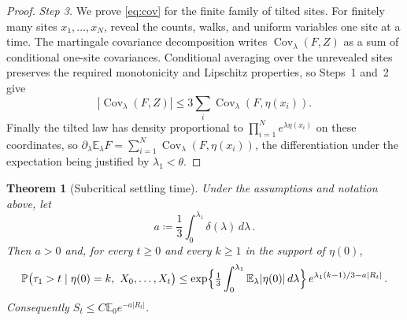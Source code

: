 \documentclass[11pt]{amsart}
\theoremstyle{plain}
\newtheorem{theorem}{Theorem}[section]
\theoremstyle{definition}
\newcommand{\E}{\mathbb{E}}
\renewcommand{\P}{\mathbb{P}}
\DeclareMathOperator{\Cov}{Cov}
\begin{document}
\begin{proof}
	\smallskip
	\noindent\emph{Step 3.} We prove \eqref{eq:cov} for the finite family of
	tilted sites.
	For finitely many sites $x_1,\ldots,x_N$, reveal the counts, walks, and uniform variables one site at a time. The martingale covariance decomposition writes $\Cov_\lambda(F,Z)$ as a sum of conditional one-site covariances. Conditional averaging over the unrevealed sites preserves the required monotonicity and Lipschitz properties,
	so Steps~1 and~2 give
	\[
		|\Cov_\lambda(F,Z)|
		\leq3\sum_i\Cov_\lambda(F,\eta(x_i)).
	\]
	Finally the tilted law has density proportional
	to $\prod_{i=1}^Ne^{\lambda\eta(x_i)}$ on these coordinates, so
	$\partial_\lambda\E_\lambda F=\sum_{i=1}^N\Cov_\lambda(F,\eta(x_i))$, the
	differentiation under the expectation being justified by $\lambda_1<\theta$.
\end{proof}

\begin{theorem}[Subcritical settling time]\label{thm:subcritical}
	Under the assumptions and notation above, let
	\[
		a\coloneqq\frac13\int_0^{\lambda_1}\delta(\lambda)\,d\lambda\,.
	\]
	Then $a>0$ and, for every $t\geq0$ and every $k\geq1$ in the support of
	$\eta(0)$,
	\begin{equation}\label{eq:range-upper}
		\P\bigl(\tau_1>t\mid\eta(0)=k,\ X_0,\ldots,X_t\bigr)
		\leq\exp\Bigl\{\tfrac13\int_0^{\lambda_1}\E_\lambda|\eta(0)|
		\,d\lambda\Bigr\}\,e^{\lambda_1(k-1)/3-a|R_t|}\,.
	\end{equation}
	Consequently $S_t\leq C\E_0e^{-a|R_t|}$.
\end{theorem}
\end{document}
